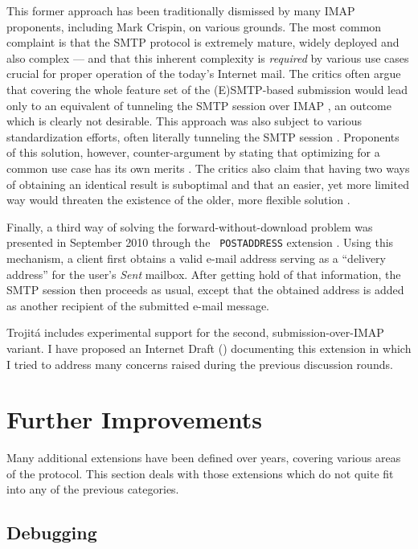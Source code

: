\documentclass[trojita]{subfiles}
\begin{document}
This former approach has been traditionally dismissed by many IMAP proponents, including Mark Crispin, on various
grounds.  The most common complaint is that the SMTP protocol is extremely mature, widely deployed and also complex ---
and that this inherent complexity is {\em required} by various use cases crucial for proper operation of the today's
Internet mail.  The critics often argue that covering the whole feature set of the (E)SMTP-based submission would lead
only to an equivalent of tunneling the SMTP session over IMAP \cite{crispin-smtp-tunneling}
\cite{cridland-imap-submission-sendmail-not-enough}, an outcome which is clearly not desirable.  This approach was
also subject to various standardization efforts, often literally tunneling the SMTP session \cite[p.
30]{draft-maes-lemonade-p-imap}.  Proponents of this solution, however, counter-argument by stating that optimizing for
a common use case has its own merits \cite{brong-common-sendmail-makes-sense}.  The critics also claim that having two
ways of obtaining an identical result is suboptimal and that an easier, yet more limited way would threaten the
existence of the older, more flexible solution \cite{crispin-submission-would-kill-smtp}.

Finally, a third way of solving the forward-without-download problem was presented in September 2010 through the {\tt
POSTADDRESS} extension \cite{draft-melnikov-imap-postaddress}.  Using this mechanism, a client first obtains a valid
e-mail address serving as a ``delivery address'' for the user's {\em Sent} mailbox.  After getting hold of that
information, the SMTP session then proceeds as usual, except that the obtained address is added as another recipient of
the submitted e-mail message.

Trojitá includes experimental support for the second, submission-over-IMAP variant.  I have proposed an Internet Draft
() documenting this extension in which I tried to address many concerns raised during the
previous discussion rounds.

\section{Further Improvements}

Many additional extensions have been defined over years, covering various areas of the protocol.  This section deals
with those extensions which do not quite fit into any of the previous categories.

\subsection{Debugging}
\end{document}

